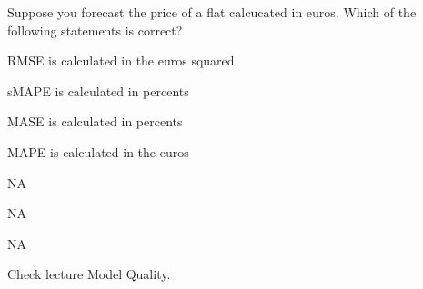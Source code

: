 
\begin{question}
Suppose you forecast the price of a flat calcucated in euros.
Which of the following statements is correct?
\begin{answerlist}
  \item RMSE is calculated in the euros squared
  \item sMAPE is calculated in percents
  \item MASE is calculated in percents
  \item MAPE is calculated in the euros
\end{answerlist}
\end{question}

\begin{solution}
\begin{answerlist}
  \item NA
  \item NA
  \item NA
  \item Check lecture Model Quality.
\end{answerlist}
\end{solution}

